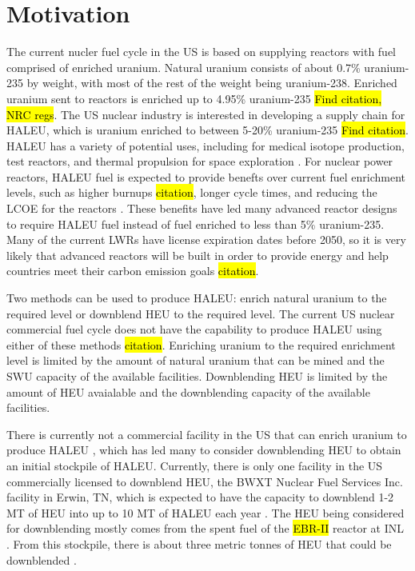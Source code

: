 \section{Motivation}
The current nucler fuel cycle in the US is based on supplying reactors 
with fuel comprised of enriched uranium. Natural uranium consists of 
about 0.7\% uranium-235 by weight, with most of the rest of the weight being 
uranium-238. Enriched uranium sent to reactors is enriched up to 4.95\% 
uranium-235 \hl{Find citation, NRC regs}. The US nuclear industry is 
interested in developing a supply chain for \gls{HALEU}, which is 
uranium enriched to between 5-20\% uranium-235 \hl{Find citation}. \gls{HALEU}
has a variety of potential uses, including for medical isotope production,
test reactors, and thermal propulsion for space exploration \cite{nagley_ha-leu_2020}.
For nuclear power reactors, \gls{HALEU} fuel is expected to provide benefts 
over current fuel enrichment levels, such as higher burnups \hl{citation},
longer cycle times, and 
reducing the \gls{LCOE} for the reactors \cite{carlson_economic_2020}. These 
benefits have led many advanced reactor designs to require 
\gls{HALEU} fuel instead of fuel enriched to less than 5\% uranium-235. 
Many of the current \glspl{LWR} have license expiration dates before 2050, 
so it is very likely that advanced reactors will be built in order to 
provide energy and help countries meet their carbon emission goals \hl{citation}.

Two methods can be used to produce \gls{HALEU}: enrich natural uranium to the 
required level or downblend \gls{HEU} to the required level. The current US
nuclear commercial fuel cycle does not have the capability to produce 
\gls{HALEU} using either of these methods \hl{citation}. Enriching uranium 
to the required enrichment level is limited by the amount of natural uranium 
that can be mined and the \gls{SWU} capacity of the available facilities. 
Downblending \gls{HEU} is limited by the amount of \gls{HEU} avaialable and 
the downblending capacity of the available facilities. 

There is currently not a commercial facility in the US that can enrich 
uranium to produce \gls{HALEU} \cite{hussain_nei_2018}, which has led 
many to consider downblending \gls{HEU} to obtain an initial stockpile of 
\gls{HALEU}. 
Currently, there is only one facility in the US commercially licensed to 
downblend \gls{HEU}, the BWXT Nuclear Fuel Services Inc. facility in 
Erwin, TN, which is expected to have the capacity to downblend 1-2 
MT of \gls{HEU} into up to 10 MT of \gls{HALEU} each year \cite{nagley_ha-leu_2020}.
The \gls{HEU} being considered for downblending mostly comes from the spent 
fuel of the \hl{EBR-II} reactor at \gls{INL} \cite{patterson_haleu_2019}. From 
this stockpile, there is about three metric tonnes of \gls{HEU} that 
could be downblended \cite{patterson_haleu_2019}.



